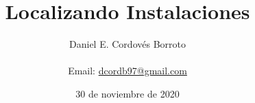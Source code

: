 \documentclass{article}
\author{Daniel E. Cordovés Borroto \\ \\ Email: \href{mailto:dcordb97@gmail.com}{dcordb97@gmail.com}}
\title{Localizando Instalaciones}
\begin{document}
    \date{30 de noviembre de 2020}
	\maketitle
	\newpage
	\tableofcontents
	
    
    
    
    
	
\end{document}

